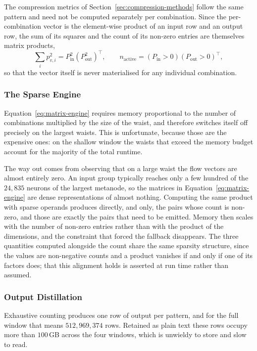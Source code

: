 \documentclass[12pt,a4paper,oneside]{article}
\theoremstyle{definition}
\theoremstyle{plain}
\begin{document}
The compression metrics of Section~\ref{sec:compression-methods} follow the
same pattern and need not be computed separately per combination. Since the
per-combination vector is the element-wise product of an input row and an
output row, the sum of its squares and the count of its non-zero entries are
themselves matrix products,
\begin{equation}
  \textstyle\sum_i p_{v,i}^2 = P_{\mathrm{in}}^{2} (P_{\mathrm{out}}^{2})^{\top},
  \qquad
  n_{\mathrm{active}} = (P_{\mathrm{in}} > 0)(P_{\mathrm{out}} > 0)^{\top},
\end{equation}
so that the vector itself is never materialised for any individual
combination.

\subsubsection{The Sparse Engine}

Equation~\eqref{eq:matrix-engine} requires memory proportional to the number
of combinations multiplied by the size of the waist, and therefore switches
itself off precisely on the largest waists. This is unfortunate, because
those are the expensive ones: on the shallow window the waists that exceed
the memory budget account for the majority of the total runtime.

The way out comes from observing that on a large waist the flow vectors are
almost entirely zero. An input group typically reaches only a few hundred of
the $24{,}835$ neurons of the largest metanode, so the matrices in
Equation~\eqref{eq:matrix-engine} are dense representations of almost
nothing. Computing the same product with sparse operands produces directly,
and only, the pairs whose count is non-zero, and those are exactly the pairs
that need to be emitted. Memory then scales with the number of non-zero
entries rather than with the product of the dimensions, and the constraint
that forced the fallback disappears. The three quantities computed
alongside the count share the same sparsity structure, since the values are
non-negative counts and a product vanishes if and only if one of its factors
does; that this alignment holds is asserted at run time rather than assumed.

\subsubsection{Output Distillation}
\label{sec:distillation}

Exhaustive counting produces one row of output per pattern, and for the full
window that means $512{,}969{,}374$ rows. Retained as plain text these rows
occupy more than $100$\,GB across the four windows, which is unwieldy to
store and slow to read.
\end{document}
